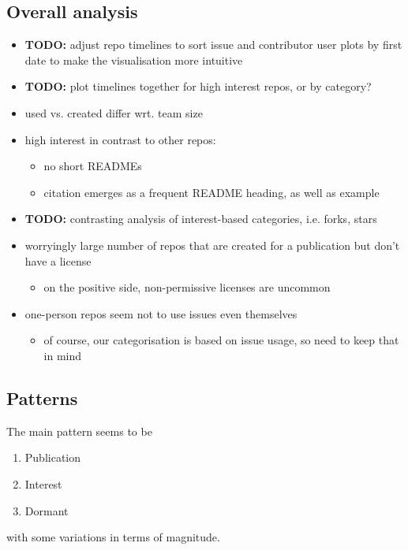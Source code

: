 \documentclass[10pt,a4paper]{scrartcl}
\begin{document}
\subsection*{Overall analysis}
\begin{itemize}
    \item \textbf{TODO: }adjust repo timelines to sort issue and contributor user plots by first date to make the visualisation more intuitive
    \item \textbf{TODO: }plot timelines together for high interest repos, or by category?
\end{itemize}

\begin{itemize}
    \item used vs. created differ wrt. team size
    \item high interest in contrast to other repos:
    \begin{itemize}
        \item no short READMEs
        \item citation emerges as a frequent README heading, as well as example
    \end{itemize}
    \item \textbf{TODO: }contrasting analysis of interest-based categories, i.e. forks, stars
    \item worryingly large number of repos that are created for a publication but don't have a license
    \begin{itemize}
        \item on the positive side, non-permissive licenses are uncommon
    \end{itemize}
    \item one-person repos seem not to use issues even themselves
    \begin{itemize}
        \item of course, our categorisation is based on issue usage, so need to keep that in mind
    \end{itemize}
\end{itemize}

\subsection*{Patterns}

The main pattern seems to be 
\begin{enumerate}
    \item Publication
    \item Interest
    \item Dormant
\end{enumerate}
with some variations in terms of magnitude.
\end{document}
